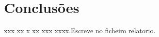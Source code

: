 \documentclass[a4paper,openright,twoside,11pt]{report}
\begin{document}
\cleardoublepage
\tableofcontents \cleardoublepage



\setcounter{page}{1}









%

%

\chapter{Conclusões} \label{cap:conc}
xxx xx x xx xxx xxxx.Escreve no ficheiro relatorio.
\nocite{*}



%
\end{document}
